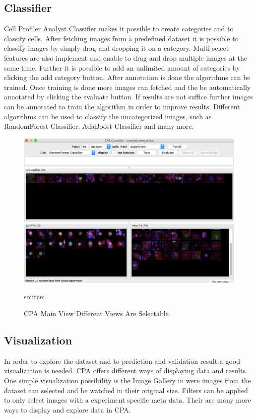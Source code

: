 \subsection{Classifier}
Cell Profiler Analyst Classifier makes it possible to create categories and to classify cells. After fetching images from a predefined dataset it is possible to classify images by simply drag and dropping it on a category. Multi select features are also implement and enable to drag and drop multiple images at the same time. Further it is possible to add an unlimited amount of categories by clicking the add category button. After annotation is done the algorithms can be trained. Once training is done more images can fetched and the be automatically annotated by clicking the evaluate button. If results are not suffice further images can be annotated to train the algorithm in order to improve results. Different algorithms can be used to classify the uncategorized images, such as RandomForest Classifier, AdaBoost Classifier and many more.

\begin{figure}[H]
	\centering
	\includegraphics[width=0.7\linewidth]{bilder/related_work/classifier.png}
	\caption{CPA Main View Different Views Are Selectable} source:\cite{Jones2008}
	\label{fig:Classifier}
\end{figure}


\subsection{Visualization}


In order to explore the dataset and to prediction and validation result a good visualization is needed. CPA offers different ways of displaying data and results. One simple visualization possibility is the Image Gallery in were images from the dataset can selected and be watched in their original size. Filters can be applied to only select images with a experiment specific meta data. Their are many more ways to display and explore data in CPA.

